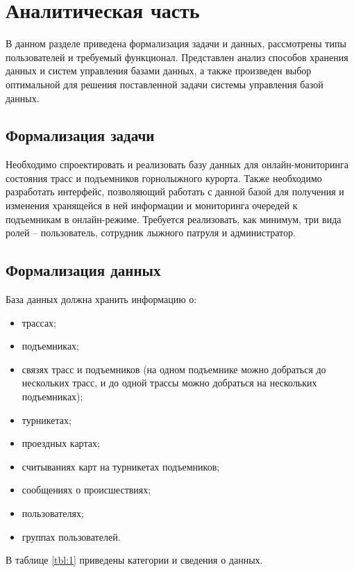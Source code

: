 \chapter{Аналитическая часть}

В данном разделе приведена формализация задачи и данных, рассмотрены типы пользователей и требуемый функционал.  Представлен анализ способов хранения данных и систем управления базами данных, а также произведен выбор оптимальной для решения поставленной задачи системы управления базой данных. 

\section{Формализация задачи}

Необходимо спроектировать и реализовать базу данных для онлайн-мониторинга состояния трасс и подъемников горнолыжного курорта. Также необходимо разработать интерфейс, позволяющий работать с данной базой для получения и изменения хранящейся в ней информации и мониторинга очередей к подъемникам в онлайн-режиме. Требуется реализовать, как минимум, три вида ролей – пользователь, сотрудник лыжного патруля и администратор.

\section{Формализация данных}\label{data}

База данных должна хранить информацию о:
\begin{itemize}
	\item трассах;
	\item подъемниках;
	\item связях трасс и подъемников (на одном подъемнике можно добраться до нескольких трасс, и до одной трассы можно добраться на нескольких подъемниках);
	\item турникетах;
	\item проездных картах;
	\item считываниях карт на турникетах подъемников;
	\item сообщениях о происшествиях;
	\item пользователях;
	\item группах пользователей.
\end{itemize}

В таблице \ref{tbl:1} приведены категории и сведения о данных.

